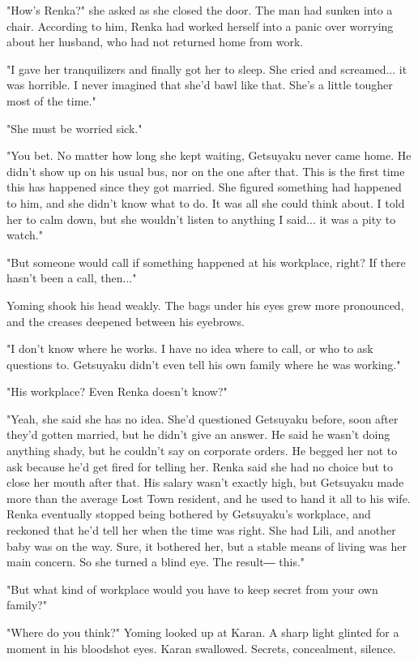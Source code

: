 "How's Renka?" she asked as she closed the door. The man had sunken into
a chair. According to him, Renka had worked herself into a panic over
worrying about her husband, who had not returned home from work.

"I gave her tranquilizers and finally got her to sleep. She cried and
screamed... it was horrible. I never imagined that she'd bawl like that.
She's a little tougher most of the time."

"She must be worried sick."

"You bet. No matter how long she kept waiting, Getsuyaku never came
home. He didn't show up on his usual bus, nor on the one after that.
This is the first time this has happened since they got married. She
figured something had happened to him, and she didn't know what to do.
It was all she could think about. I told her to calm down, but she
wouldn't listen to anything I said... it was a pity to watch."

"But someone would call if something happened at his workplace, right?
If there hasn't been a call, then..."

Yoming shook his head weakly. The bags under his eyes grew more
pronounced, and the creases deepened between his eyebrows.

"I don't know where he works. I have no idea where to call, or who to
ask questions to. Getsuyaku didn't even tell his own family where he was
working."

"His workplace? Even Renka doesn't know?"

"Yeah, she said she has no idea. She'd questioned Getsuyaku before, soon
after they'd gotten married, but he didn't give an answer. He said he
wasn't doing anything shady, but he couldn't say on corporate orders. He
begged her not to ask because he'd get fired for telling her. Renka said
she had no choice but to close her mouth after that. His salary wasn't
exactly high, but Getsuyaku made more than the average Lost Town
resident, and he used to hand it all to his wife. Renka eventually
stopped being bothered by Getsuyaku's workplace, and reckoned that he'd
tell her when the time was right. She had Lili, and another baby was on
the way. Sure, it bothered her, but a stable means of living was her
main concern. So she turned a blind eye. The result― this."

"But what kind of workplace would you have to keep secret from your own
family?"

"Where do you think?" Yoming looked up at Karan. A sharp light glinted
for a moment in his bloodshot eyes. Karan swallowed. Secrets,
concealment, silence.


